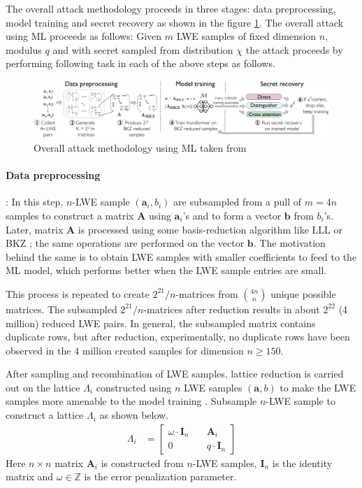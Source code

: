 The overall attack methodology proceeds in three stages: data preprocessing, model training and  secret recovery as shown in the figure \ref{fig:attack_methodology}. The overall attack using ML proceeds as follows: Given $m$ LWE samples of fixed dimension $n$, modulus $q$ and with secret sampled from distribution $\chi$ the attack proceeds by performing following task in each of the above steps as follows.
\begin{figure}
    \centering
    \includegraphics[width=\textwidth, height=.2\textwidth]{ML/Attack_methodology.png}
    \caption{Overall attack methodology using ML taken from \cite{li2023salsa}}
    \label{fig:attack_methodology}
\end{figure}

\paragraph{Data preprocessing}: In this step, $n$-LWE sample $(\textbf{a}_i,b_i)$ are subsampled from a pull of $m=4n$ samples to construct a matrix $\textbf{A}$ using $\textbf{a}_i$'s and to form a vector $\textbf{b}$ from $b_i$'s. Later, matrix $\textbf{A}$ is processed using some basis-reduction algorithm like LLL \cite{} or BKZ \cite{}; the same operations are performed on the vector $\textbf{b}$. The motivation behind the same is to obtain LWE samples with smaller coefficients to feed to the ML model, which performs better when the LWE sample entries are small.

This process is repeated to create $2^{21}/n$-matrices from ${4n \choose n}$ unique possible matrices. The subsampled $2^{21}/n$-matrices after reduction results in about $2^{22}$ (4 million) reduced LWE pairs. In general, the subsampled matrix contains duplicate rows, but after reduction, experimentally, no duplicate rows have been observed in the $4$ million created samples for dimension $n \geq 150$.

After sampling and recombination of LWE samples, lattice reduction is carried out on the lattice $\Lambda_i$ constructed using $n$ LWE samples $(\textbf{a},b)$ to make the LWE samples more amenable to the model training \cite{wenger2022salsa}. Subsample $n$-LWE sample to construct a lattice $\Lambda_i$ as shown below.
\begin{align*}
    \Lambda_i &= \begin{bmatrix}
                \omega \cdot \textbf{I}_n \hspace{1em} &  \textbf{A}_i  \\
                0                         \hspace{1em} &  q \cdot \textbf{I}_n
            \end{bmatrix}
\end{align*}
Here $n \times n$ matrix $\textbf{A}_i$ is constructed from $n$-LWE samples, $\textbf{I}_n$ is the identity matrix and $\omega \in \mathbb{Z}$ is the error penalization parameter.


